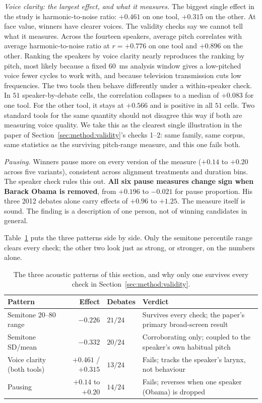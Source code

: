 \documentclass[pdflatex,sn-mathphys-num]{sn-jnl}%
\begin{document}
\emph{Voice clarity: the largest effect, and what it measures.} The biggest
single effect in the study is harmonic-to-noise ratio: $+0.461$ on one tool,
$+0.315$ on the other. At face value, winners have clearer voices. The
validity checks say we cannot tell what it measures. Across the fourteen
speakers, average pitch correlates with average harmonic-to-noise ratio at
$r = +0.776$ on one tool and $+0.896$ on the other. Ranking the speakers by
voice clarity nearly reproduces the ranking by pitch, most likely because a
fixed $60$~ms analysis window gives a low-pitched voice fewer cycles to work
with, and because television transmission cuts low frequencies. The two
tools then behave differently under a within-speaker check. In $51$
speaker-by-debate cells, the correlation collapses to a median of $+0.083$
for one tool. For the other tool, it stays at $+0.566$ and is positive in
all $51$ cells. Two standard tools for the same quantity should not disagree this
way if both are measuring voice quality. We take this as the clearest single
illustration in the paper of Section~\ref{sec:method:validity}'s checks
1--2: same family, same corpus, same statistics as the surviving
pitch-range measure, and this one fails both.

\emph{Pausing.} Winners pause more on every version of the measure ($+0.14$
to $+0.20$ across five variants), consistent across alignment treatments and
duration bins. The speaker check rules this out. \textbf{All six pause
measures change sign when Barack Obama is removed}, from $+0.196$ to
$-0.021$ for pause proportion. His three 2012 debates alone carry effects of
$+0.96$ to $+1.25$. The measure itself is sound. The finding is a
description of one person, not of winning candidates in general.

Table~\ref{tab:acousticsummary} puts the three patterns side by side. Only
the semitone percentile range clears every check; the other two look just
as strong, or stronger, on the numbers alone.

\begin{table}[t]
\caption{The three acoustic patterns of this section, and why only one
survives every check in Section~\ref{sec:method:validity}.}
\label{tab:acousticsummary}
\centering
\footnotesize
\setlength{\tabcolsep}{3pt}
\begin{tabular}{lrlp{}}
\toprule
Pattern & Effect & Debates & Verdict \\
\midrule
Semitone $20$--$80$ range & $-0.226$ & $21/24$ & Survives every check; the paper's primary broad-screen result \\
Semitone SD/mean & $-0.332$ & $20/24$ & Corroborating only; coupled to the speaker's own habitual pitch \\
Voice clarity (both tools) & $+0.461$ / $+0.315$ & $13/24$ & Fails; tracks the speaker's larynx, not behaviour \\
Pausing & $+0.14$ to $+0.20$ & $14/24$ & Fails; reverses when one speaker (Obama) is dropped \\
\bottomrule
\end{tabular}
\end{table}
\end{document}
